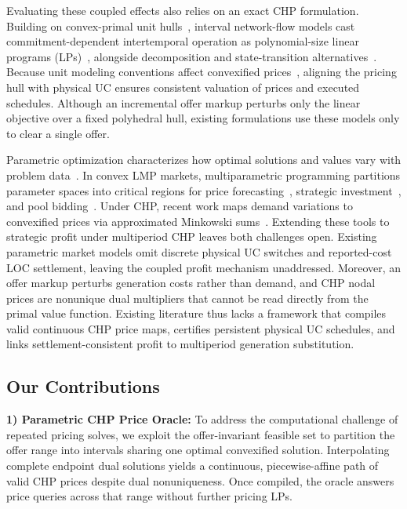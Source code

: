 \documentclass[journal]{IEEEtran}
\begin{document}
Evaluating these coupled effects also relies on an exact CHP formulation. Building on convex-primal unit hulls~\cite{hua2017}, interval network-flow models cast commitment-dependent intertemporal operation as polynomial-size linear programs (LPs)~\cite{pan2018,yu2019,networkflow}, alongside decomposition and state-transition alternatives~\cite{andrianesis2022dw,xiao2024}. Because unit modeling conventions affect convexified prices~\cite{zhao2023dependence}, aligning the pricing hull with physical UC ensures consistent valuation of prices and executed schedules. Although an incremental offer markup perturbs only the linear objective over a fixed polyhedral hull, existing formulations use these models only to clear a single offer.

Parametric optimization characterizes how optimal solutions and values vary with problem data~\cite{bertsimas1997}. In convex LMP markets, multiparametric programming partitions parameter spaces into critical regions for price forecasting~\cite{ji2017probabilistic}, strategic investment~\cite{taheri2022strategic}, and pool bidding~\cite{zheng2023pool}. Under CHP, recent work maps demand variations to convexified prices via approximated Minkowski sums~\cite{jiang2026minkowski}. Extending these tools to strategic profit under multiperiod CHP leaves both challenges open. Existing parametric market models omit discrete physical UC switches and reported-cost LOC settlement, leaving the coupled profit mechanism unaddressed. Moreover, an offer markup perturbs generation costs rather than demand, and CHP nodal prices are nonunique dual multipliers that cannot be read directly from the primal value function. Existing literature thus lacks a framework that compiles valid continuous CHP price maps, certifies persistent physical UC schedules, and links settlement-consistent profit to multiperiod generation substitution.

\subsection{Our Contributions}
\textbf{1) Parametric CHP Price Oracle:}
To address the computational challenge of repeated pricing solves, we exploit the offer-invariant feasible set to partition the offer range into intervals sharing one optimal convexified solution. Interpolating complete endpoint dual solutions yields a continuous, piecewise-affine path of valid CHP prices despite dual nonuniqueness. Once compiled, the oracle answers price queries across that range without further pricing LPs.
\end{document}
